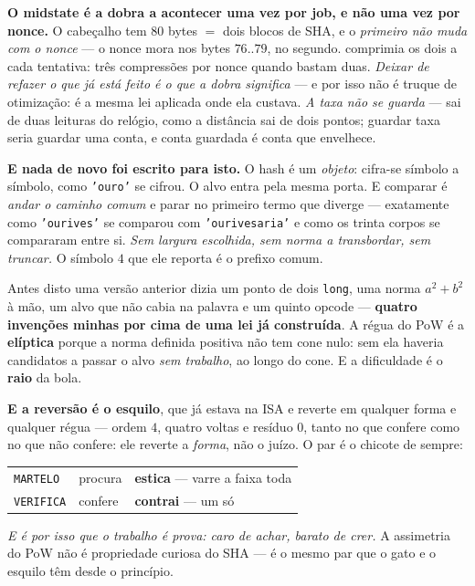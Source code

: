 \documentclass[11pt]{article}
\newcommand{\code}[1]{\texttt{\small #1}}
\theoremstyle{plain}
\theoremstyle{remark}
\begin{document}
\begin{itemize}
\textbf{O midstate é a dobra a acontecer uma vez por job, e não uma vez por nonce.} O cabeçalho
tem $80$ bytes $=$ dois blocos de SHA, e o \emph{primeiro não muda com o nonce} --- o nonce mora
nos bytes $76..79$, no segundo. comprimia os dois a cada tentativa: três compressões por nonce
quando bastam duas. \emph{Deixar de refazer o que já está feito é o que a dobra significa} --- e
por isso não é truque de otimização: é a mesma lei aplicada onde ela custava. \emph{A taxa não se guarda} --- sai de duas leituras do relógio, como a distância
sai de dois pontos; guardar taxa seria guardar uma conta, e conta guardada é conta que envelhece.

\textbf{E nada de novo foi escrito para isto.} O hash é um \emph{objeto}: cifra-se símbolo a
símbolo, como \code{'ouro'} se cifrou. O alvo entra pela mesma porta. E comparar é \emph{andar o
caminho comum} e parar no primeiro termo que diverge --- exatamente como \code{'ourives'} se
comparou com \code{'ourivesaria'} e como os trinta corpos se compararam entre si. \emph{Sem
largura escolhida, sem norma a transbordar, sem truncar.} O símbolo $4$ que ele reporta é o
prefixo comum.

Antes disto uma versão anterior dizia um ponto de dois \code{long}, uma norma $a^2+b^2$ à mão, um alvo que
não cabia na palavra e um quinto opcode --- \textbf{quatro invenções minhas por cima de uma lei já
construída}. A régua do PoW é a \textbf{elíptica} porque a norma definida positiva não tem cone
nulo: sem ela haveria candidatos a passar o alvo \emph{sem trabalho}, ao longo do cone. E a
dificuldade é o \textbf{raio} da bola.

\textbf{E a reversão é o esquilo}, que já estava na ISA e reverte em qualquer forma e qualquer
régua --- ordem $4$, quatro voltas e resíduo $0$, tanto no que confere como no que não confere:
ele reverte a \emph{forma}, não o juízo. O par é o chicote de sempre:

\begin{center}\begin{tabular}{@{}lll@{}}
\code{MARTELO} & procura & \textbf{estica} --- varre a faixa toda\\
\code{VERIFICA} & confere & \textbf{contrai} --- um só\\
\end{tabular}\end{center}

\emph{E é por isso que o trabalho é prova: caro de achar, barato de crer.} A assimetria do PoW não
é propriedade curiosa do SHA --- é o mesmo par que o gato e o esquilo têm desde o princípio.


\end{itemize}
\end{document}
